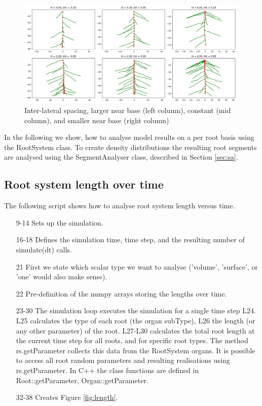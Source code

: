 \begin{figure}
\centering
\includegraphics[width=0.99\textwidth]{fig_lateralspacing.png}
\caption{Inter-lateral spacing, larger near base (left column), constant (mid column), and smaller near base (right column) } \label{fig:spacing}
\end{figure}

In the following we show, how to analyse model results on a per root basis using the RootSystem class. To create density distributions the resulting root segments are analysed using the SegmentAnalyser class, described in Section \ref{sec:sa}.


\subsection{Root system length over time}

The following script shows how to analyse root system length versus time. 



\begin{itemize}
\item[9-14] Sets up the simulation.

\item[16-18] Defines the simulation time, time step, and the resulting number of simulate(dt) calls. 

\item[21] First we state which scalar type we want to analyse ('volume', 'surface', or 'one' would also make sense). 

\item[22] Pre-definition of the numpy arrays storing the lengths over time. 

\item[23-30] The simulation loop executes the simulation for a single time step L24. L25 calculates the type of each root (the organ subType), L26 the length (or any other parameter) of the root. L27-L30 calculates the total root length at the current time step for all roots, and for specific root types. The method rs.getParameter collects this data from the RootSystem organs. It is possible to access all root random parameters and resulting realisations using rs.getParameter. In C++ the class functions are defined in Root::getParameter, Organ::getParameter. 

\item[32-38] Creates Figure \ref{fig:length}.

\end{itemize}



